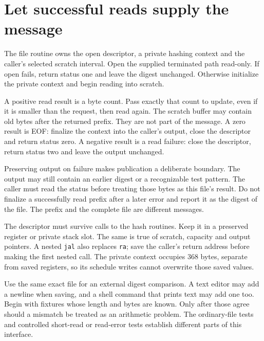 \section{Let successful reads supply the message}
The file routine owns the open descriptor, a private hashing context and the caller's
selected scratch interval. Open the supplied terminated path read-only. If open fails,
return status one and leave the digest unchanged. Otherwise initialize the private
context and begin reading into scratch.

A positive read result is a byte count. Pass exactly that count to update, even if it
is smaller than the request, then read again. The scratch buffer may contain old bytes
after the returned prefix. They are not part of the message. A zero result is EOF:
finalize the context into the caller's output, close the descriptor and return status
zero. A negative result is a read failure: close the descriptor, return status two and
leave the output unchanged.

Preserving output on failure makes publication a deliberate boundary. The output may
still contain an earlier digest or a recognizable test pattern. The caller must read
the status before treating those bytes as this file's result. Do not finalize a
successfully read prefix after a later error and report it as the digest of the file.
The prefix and the complete file are different messages.

The descriptor must survive calls to the hash routines. Keep it in a preserved register
or private stack slot. The same is true of scratch, capacity and output pointers. A
nested \texttt{jal} also replaces \texttt{ra}; save the caller's return address before
making the first nested call. The private context occupies 368 bytes, separate from
saved registers, so its schedule writes cannot overwrite those saved values.

Use the same exact file for an external digest comparison. A text editor may add a
newline when saving, and a shell command that prints text may add one too. Begin with
fixtures whose length and bytes are known. Only after those agree should a mismatch
be treated as an arithmetic problem. The ordinary-file tests and controlled short-read
or read-error tests establish different parts of this interface.
